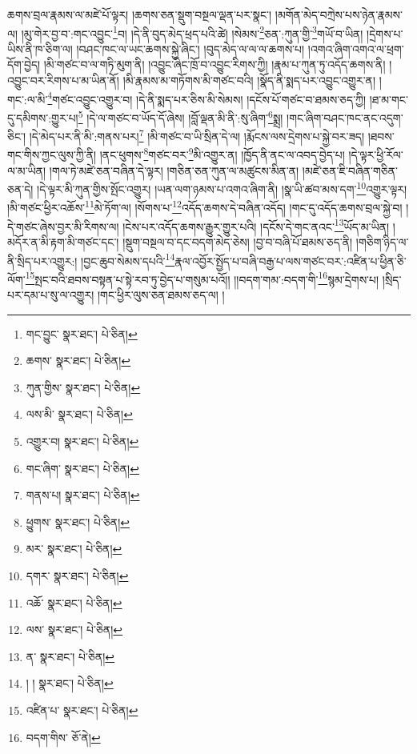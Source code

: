 ཆགས་བྲལ་རྣམས་ལ་མཛེ་པོ་ལྟར། །ཆགས་ཅན་སྡུག་བསྔལ་ལྡན་པར་སྣང་། །མགོན་མེད་བཀྲེས་པས་ཉེན་རྣམས་ལ། །མུ་གེར་བྱ་བ་:གང་འབྱུང་\footnote{གང་བྱུང་  སྣར་ཐང་།  པེ་ཅིན། }བ། །དེ་ནི་བུད་མེད་ཕྲད་པའི་ཚེ། །སེམས་\footnote{ཆགས་  སྣར་ཐང་།  པེ་ཅིན། }ཅན་:ཀུན་གྱི་\footnote{ཀུན་གྱིས་  སྣར་ཐང་།  པེ་ཅིན། }གཡོ་བ་ཡིན། །དྲེགས་པ་ཡིས་ནི་ཁ་ཅིག་ལ། །བཤང་ཁང་ལ་ཡང་ཆགས་སྐྱེ་ཞིང་། །བུད་མེད་ལ་ལ་ལ་ཆགས་པ། །འགའ་ཞིག་འགའ་ལ་ཕྲག་དོག་བྱེད། །མི་གཙང་བ་ལ་གཏི་མུག་ནི། །འབྱུང་ཞིང་ཁྲོ་བ་འབྱུང་རིགས་ཀྱི། །རྣམ་པ་ཀུན་ཏུ་འདོད་ཆགས་ནི། །འབྱུང་བར་རིགས་པ་མ་ཡིན་ནོ། །མི་རྣམས་མ་གཏོགས་མི་གཙང་བའི། །སྣོད་ནི་སྨད་པར་འབྱུང་འགྱུར་ན། །གང་:ལ་མི་\footnote{ལས་མི་  སྣར་ཐང་།  པེ་ཅིན། }གཙང་འབྱུང་འགྱུར་བ། །དེ་ནི་སྨད་པར་ཅིས་མི་སེམས། །དངོས་པོ་གཙང་བ་ཐམས་ཅད་ཀྱི། །ཐ་མ་གང་དུ་དམིགས་:གྱུར་པ།\footnote{འགྱུར་བ།  སྣར་ཐང་།  པེ་ཅིན། } །དེ་ལ་གཙང་བ་ཡོད་དོ་ཞེས། །བློ་ལྡན་མི་ནི་:སུ་ཞིག་\footnote{གང་ཞིག་  སྣར་ཐང་།  པེ་ཅིན། }སྨྲ། །གང་ཞིག་བཤང་ཁང་ནང་འདུག་ཅིང་། །དེ་མེད་པར་ནི་མི་:གནས་པར།\footnote{གནས་པ།  སྣར་ཐང་།  པེ་ཅིན། } །མི་གཙང་བ་ཡི་སྲིན་དེ་ལ། །རྨོངས་ལས་དྲེགས་པ་སྐྱེ་བར་ཟད། །ཐབས་གང་གིས་ཀྱང་ལུས་ཀྱི་ནི། །ནང་ཕུགས་\footnote{ཕྱུགས་  སྣར་ཐང་།  པེ་ཅིན། }གཙང་བར་\footnote{མར་  སྣར་ཐང་།  པེ་ཅིན། }མི་འགྱུར་ན། །ཁྱོད་ནི་ནང་ལ་འབད་བྱེད་པ། །དེ་ལྟར་ཕྱི་རོལ་ལ་མ་ཡིན། །གལ་ཏེ་མཛེ་ཅན་བཞིན་དེ་ལྟར། །གཅིན་ཅན་ཀུན་ལ་མཚུངས་མིན་ན། །མཛེ་ཅན་ཇི་བཞིན་གཅིན་ཅན་དེ། །དེ་ལྟར་མི་ཀུན་གྱིས་སྤོང་འགྱུར། །ཡན་ལག་ཉམས་པ་འགའ་ཞིག་ནི། །སྣ་ཡི་ཚབ་མས་དག་\footnote{དགར་  སྣར་ཐང་།  པེ་ཅིན། }འགྱུར་ལྟར། །མི་གཙང་ཕྱིར་འཆོས་\footnote{འཆོ་  སྣར་ཐང་།  པེ་ཅིན། }མེ་ཏོག་ལ། །སོགས་པ་\footnote{ལས་  སྣར་ཐང་།  པེ་ཅིན། }འདོད་ཆགས་དེ་བཞིན་འདོད། །གང་དུ་འདོད་ཆགས་བྲལ་སྐྱེ་བ། །དེ་གཙང་ཞེས་བྱར་མི་རིགས་ལ། །ངེས་པར་འདོད་ཆགས་རྒྱུར་གྱུར་པའི། །དངོས་དེ་གང་ནའང་\footnote{ན་  སྣར་ཐང་།  པེ་ཅིན། }ཡོད་མ་ཡིན། །མདོར་ན་མི་རྟག་མི་གཙང་དང་། །སྡུག་བསྔལ་བ་དང་བདག་མེད་ཅེས། །བྱ་བ་བཞི་པོ་ཐམས་ཅད་ནི། །གཅིག་ཉིད་ལ་ནི་སྲིད་པར་འགྱུར:། །བྱང་ཆུབ་སེམས་དཔའི་\footnote{། །  སྣར་ཐང་།  པེ་ཅིན། }རྣལ་འབྱོར་སྤྱོད་པ་བཞི་བརྒྱ་པ་ལས་གཙང་བར་:འཛིན་པ་ཕྱིན་ཅི་ལོག་\footnote{འཛིན་པ་  སྣར་ཐང་།  པེ་ཅིན། }སྤང་བའི་ཐབས་བསྟན་པ་སྟེ་རབ་ཏུ་བྱེད་པ་གསུམ་པའོ།། །།བདག་གམ་:བདག་གི་\footnote{བདག་གིས་  ཅོ་ནེ། }སྙམ་དྲེགས་པ། །སྲིད་པར་དམ་པ་སུ་ལ་འགྱུར། །གང་ཕྱིར་ལུས་ཅན་ཐམས་ཅད་ལ། །
